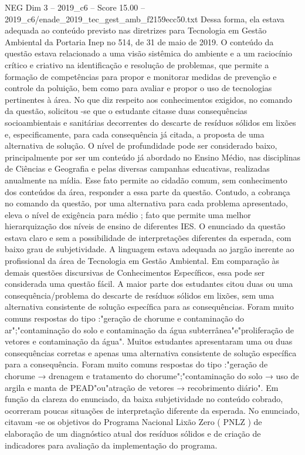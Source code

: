 \begin{textsample}{NEG Dim 3 – 2019\_c6 – Score 15.00 – 2019\_c6/enade\_2019\_tec\_gest\_amb\_f2159ecc50.txt}
Dessa forma, ela estava adequada ao conteúdo previsto nas diretrizes para Tecnologia em Gestão Ambiental da Portaria Inep no 514, de 31 de maio de 2019.
O conteúdo da questão estava relacionado a uma visão sistêmica do ambiente e a um raciocínio crítico e criativo na identificação e resolução de problemas, que permite a formação de competências para propor e monitorar medidas de prevenção e controle da poluição, bem como para avaliar e propor o uso de tecnologias pertinentes à área.
No que diz respeito aos conhecimentos exigidos, no comando da questão, solicitou -se que o estudante citasse duas consequências socioambientais e sanitárias decorrentes do descarte de resíduos sólidos em lixões e, especificamente, para cada consequência já citada, a proposta de uma alternativa de solução.
O nível de profundidade pode ser considerado baixo, principalmente por ser um conteúdo já abordado no Ensino Médio, nas disciplinas de Ciências e Geografia e pelas diversas campanhas educativas, realizadas anualmente na mídia.
Esse fato permite ao cidadão comum, sem conhecimento dos conteúdos da área, responder a essa parte da questão.
Contudo, a cobrança no comando da questão, por uma alternativa para cada problema apresentado, eleva o nível de exigência para médio ; fato que permite uma melhor hierarquização dos níveis de ensino de diferentes IES.
O enunciado da questão estava claro e sem a possibilidade de interpretações diferentes da esperada, com baixo grau de subjetividade.
A linguagem estava adequada ao jargão inerente ao profissional da área de Tecnologia em Gestão Ambiental.
Em comparação às demais questões discursivas de Conhecimentos Específicos, essa pode ser considerada uma questão fácil.
A maior parte dos estudantes citou duas ou uma consequência/problema do descarte de resíduos sólidos em lixões, sem uma alternativa consistente de solução específica para as consequências.
Foram muito comuns respostas do tipo :"geração de chorume e contaminação do ar";"contaminação do solo e contaminação da água subterrânea"e"proliferação de vetores e contaminação da água".
Muitos estudantes apresentaram uma ou duas consequências corretas e apenas uma alternativa consistente de solução específica para a consequência.
Foram muito comuns respostas do tipo :"geração de chorume → drenagem e tratamento do chorume";"contaminação do solo → uso de argila e manta de PEAD"ou"atração de vetores → recobrimento diário".
Em função da clareza do enunciado, da baixa subjetividade no conteúdo cobrado, ocorreram poucas situações de interpretação diferente da esperada.
No enunciado, citavam -se os objetivos do Programa Nacional Lixão Zero ( PNLZ ) de elaboração de um diagnóstico atual dos resíduos sólidos e de criação de indicadores para avaliação da implementação do programa.

\end{textsample}

